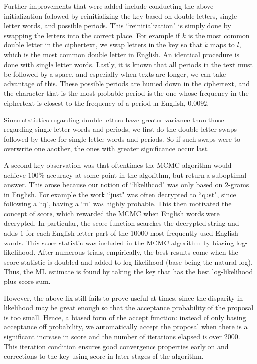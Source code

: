 \documentclass{article}
\theoremstyle{definition}
\theoremstyle{remark}
\begin{document}
Further improvements that were added include conducting the above initialization followed by reinitializing the key based on double letters, single letter words, and possible periods. This ``reinitialization" is simply done by swapping the letters into the correct place. For example if $k$ is the most common double letter in the ciphertext, we swap letters in the key so that $k$ maps to $l$, which is the most common double letter in English. An identical procedure is done with single letter words. Lastly, it is known that all periods in the text must be followed by a space, and especially when texts are longer, we can take advantage of this. These possible periods are hunted down in the ciphertext, and the character that is the most probable period is the one whose frequency in the ciphertext is closest to the frequency of a period in English, $0.0092$. 

Since statistics regarding double letters have greater variance than those regarding single letter words and periods, we first do the double letter swaps followed by those for single letter words and periods. So if such swaps were to overwrite one another, the ones with greater significance occur last.

A second key observation was that oftentimes the MCMC algorithm would achieve $100\%$ accuracy at some point in the algorithm, but return a suboptimal answer. This arose because our notion of ``likelihood" was only based on $2$-grams in English. For example the work ``just" was often decrypted to ``qust", since following a ``q", having a ``u" was highly probable. This then motivated the concept of score, which rewarded the MCMC when English words were decrypted. In particular, the score function searches the decrypted string and adds $1$ for each English letter part of the 10000 most frequently used English words. This score statistic was included in the MCMC algorithm by biasing log-likelihood. After numerous trials, empirically, the best results come when the score statistic is doubled and added to log-likelihood (base being the natural log). Thus, the ML estimate is found by taking the key that has the best log-likelihood plus score sum.

However, the above fix still fails to prove useful at times, since the disparity in likelihood may be great enough so that the acceptance probability of the proposal is too small. Hence, a biased form of the accept function: instead of only basing acceptance off probability, we automatically accept the proposal when there is a significant increase in score and the number of iterations elapsed is over 2000. This iteration condition ensures good convergence properties early on and corrections to the key using score in later stages of the algorithm.
\end{document}
